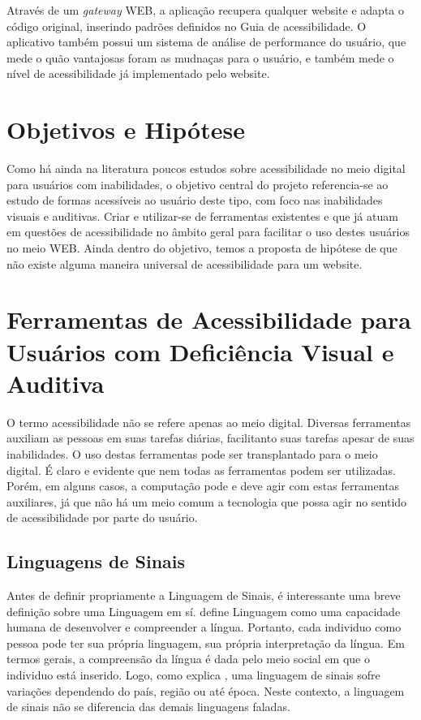 \documentclass[
	12pt,				%
	oneside,			%
	a4paper,			%
	english,			%
	brazil				%
	]{abntex2ppgsi}
\begin{document}
Através de um \textit{gateway} WEB, a aplicação recupera qualquer website e adapta o código original, inserindo padrões definidos no Guia de acessibilidade. O aplicativo também possui um sistema de análise de performance do usuário, que mede o quão vantajosas foram as mudnaças para o usuário, e também mede o nível de acessibilidade já implementado pelo website.

\chapter{Objetivos e Hipótese}

Como há ainda na literatura poucos estudos sobre acessibilidade no meio digital para usuários com inabilidades, o objetivo central do projeto referencia-se ao estudo de formas acessíveis ao usuário deste tipo, com foco nas inabilidades visuais e auditivas. Criar e utilizar-se de ferramentas existentes e que já atuam em questões de acessibilidade no âmbito geral para facilitar o uso destes usuários no meio WEB. 
Ainda dentro do objetivo, temos a proposta de hipótese de que não existe alguma maneira universal de acessibilidade para um website. 


\chapter{Ferramentas de Acessibilidade para Usuários com Deficiência Visual e Auditiva}

O termo acessibilidade não se refere apenas ao meio digital. Diversas ferramentas auxiliam as pessoas em suas tarefas diárias, facilitanto suas tarefas apesar de suas inabilidades. O uso destas ferramentas pode ser transplantado para o meio digital. É claro e evidente que nem todas as ferramentas podem ser utilizadas. Porém, em alguns casos, a computação pode e deve agir com estas ferramentas auxiliares, já que não há um meio comum a tecnologia que possa agir no sentido de acessibilidade por parte do usuário. 

\section{Linguagens de Sinais} \label{libras}

Antes de definir propriamente a Linguagem de Sinais, é interessante uma breve definição sobre uma Linguagem em sí.  define Linguagem como uma capacidade humana de desenvolver e compreender a língua. Portanto, cada individuo como pessoa pode ter sua própria linguagem, sua própria interpretação da língua. Em termos gerais, a compreensão da língua é dada pelo meio social em que o individuo está inserido. Logo, como explica , uma linguagem de sinais sofre variações dependendo do país, região ou até época. Neste contexto, a linguagem de sinais não se diferencia das demais linguagens faladas.
\end{document}
